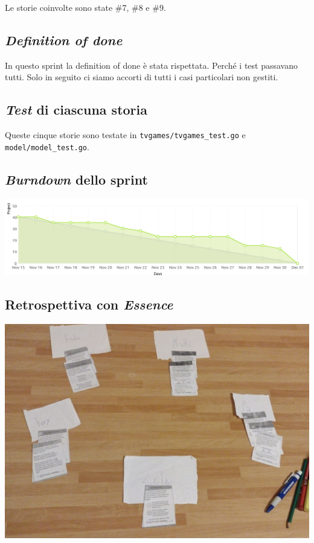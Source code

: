 \documentclass{article}
\begin{document}
Le storie coinvolte sono state \#7, \#8 e \#9.

\subsection{\emph{Definition of done}}

In questo sprint la definition of done è stata rispettata. Perché i test
passavano tutti. Solo in seguito ci siamo accorti di tutti i casi particolari
non gestiti.

\subsection{\emph{Test} di ciascuna storia}

Queste cinque storie sono testate in \verb!tvgames/tvgames_test.go! e
\verb!model/model_test.go!.

\subsection{\emph{Burndown} dello sprint}

\includegraphics[width=\textwidth]{burndown-3.png}

\subsection{Retrospettiva con \emph{Essence}}

\includegraphics[width=\textwidth]{essence-3.jpg}
\end{document}
